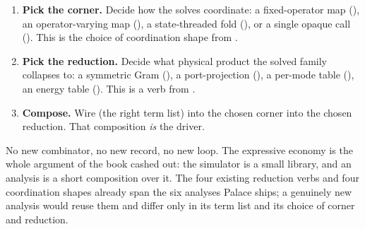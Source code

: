 \begin{enumerate}[nosep]
  \item \textbf{Pick the corner.} Decide how the solves coordinate: a fixed-operator
  map (), an operator-varying map (), a
  state-threaded fold (), or a single opaque call ().
  This is the choice of coordination shape from .
  \item \textbf{Pick the reduction.} Decide what physical product the solved family
  collapses to: a symmetric Gram (), a port-projection
  (), a per-mode table (),
  an energy table (). This is a verb from
  .
  \item \textbf{Compose.} Wire  (the right term list) into the
  chosen corner into the chosen reduction. That composition \emph{is} the driver.
\end{enumerate}

\noindent No new combinator, no new record, no new loop. The expressive economy is
the whole argument of the book cashed out: the simulator is a small library, and an
analysis is a short composition over it. The four existing reduction verbs and four
coordination shapes already span the six analyses Palace ships; a genuinely new
analysis would reuse them and differ only in its term list and its choice of corner
and reduction.

